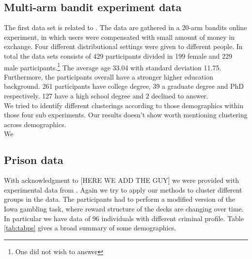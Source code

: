 \documentclass[12pt,a4paper,bibliography=totocnumbered,listof=totocnumbered]{scrartcl}
\begin{document}
\subsection{Multi-arm bandit experiment data}

The first data set is related to \cite{Stojic2015}. The data are gathered in a 20-arm bandits online experiment, in which users were compensated with small amount of money in exchange. Four different distributional settings were given to different people. In total the data sets consists of 429 participants divided in 199 female and 229 male participants.\footnote{One did not wish to answer} The average age 33.04 with standard deviation 11.75. Furthermore, the participants overall have a stronger higher education background. 261 participants have college degree, 39 a graduate degree and PhD respectively. 127 have a high school degree and 2 declined to answer.\\
We tried to identify different clusterings according to those demographics within those four sub experiments. Our results doesn't show worth mentioning clustering across demographics.\\
We 

\subsection{Prison data}

With acknowledgment to [HERE WE ADD THE GUY] we were provided with experimental data from \cite{Yechiam2008}. Again we try to apply our methods to cluster different groups in the data. The participants had to perform a modified version of the Iowa gambling task, where reward structure of the decks are changing over time. In particular we have data of 96 individuals with different criminal profile. Table \ref{tab:tabps} gives a broad summary of some demographics. 
\end{document}
